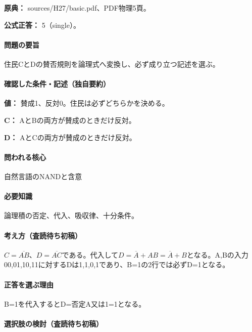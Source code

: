 \noindent\textbf{原典：} sources/H27/basic.pdf、PDF物理5頁。

\textbf{公式正答：} 5（single）。

\paragraph{問題の要旨} 住民CとDの賛否規則を論理式へ変換し、必ず成り立つ記述を選ぶ。

\paragraph{確認した条件・記述（独自要約）}\mbox{}\par

\noindent\textbf{値：} 賛成1、反対0。住民は必ずどちらかを決める。\par

\noindent\textbf{C：} AとBの両方が賛成のときだけ反対。\par

\noindent\textbf{D：} AとCの両方が賛成のときだけ反対。\par

\paragraph{問われる核心} 自然言語のNANDと含意

\paragraph{必要知識} 論理積の否定、代入、吸収律、十分条件。

\paragraph{考え方（査読待ち初稿）} \(C=\overline{AB}\)、\(D=\overline{AC}\)である。代入して\(D=\overline A+AB=\overline A+B\)となる。A,Bの入力00,01,10,11に対するDは1,1,0,1であり、B=\allowbreak{}1の2行では必ずD=\allowbreak{}1となる。

\paragraph{正答を選ぶ理由} B=\allowbreak{}1を代入するとD=否定A又は1=\allowbreak{}1となる。

\paragraph{選択肢の検討（査読待ち初稿）}\mbox{}\par

